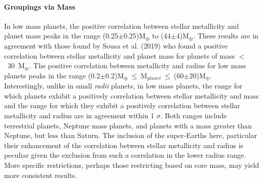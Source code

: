 \documentclass[a4paper,twocolumn,12pt]{article}
\begin{document}


\paragraph{Groupings via Mass}
In low mass planets, the positive correlation between stellar metallicity and planet mass peaks in the range (0.25$\pm$0.25)M$_{\oplus}$ to (44$\pm$4)M$_{\oplus}$. These results are in agreement with those found by Sousa et al. (2019)\cite{Sousa.et.al.} who found a positive correlation between stellar metallicity and planet mass for planets of mass $<$~30~M$_\oplus$. The positive correlation between metallicity and radius for low mass planets peaks in the range (0.2$\pm$0.2)M$_{\oplus}~\leq~$M$_{planet}~\leq~$(60$\pm$20)M$_{\oplus}$.\\
Interestingly, unlike in small \textit{radii} planets, in low mass planets, the range for which planets exhibit a positively correlation between stellar metallicity and mass and the range for which they exhibit a positively correlation between stellar metallicity and radius are in agreement within 1 $\sigma$. Both ranges include terrestrial planets, Neptune mass planets, and planets with a mass greater than Neptune, but less than Saturn. The inclusion of the super-Earths here, particular their enhancement of the correlation between stellar metallicity and radius is peculiar given the exclusion from such a correlation in the lower radius range. More specific restrictions, perhaps those restricting based on core mass, may yield more consistent results.
\end{document}
